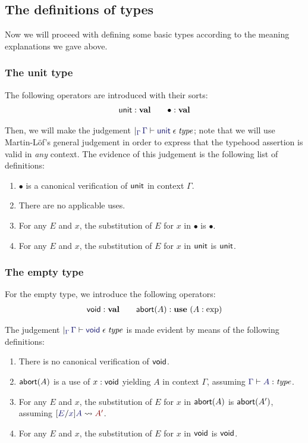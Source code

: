 \documentclass[main.tex]{subfiles}
\begin{document}
\subsection{The definitions of types}

Now we will proceed with defining some basic types according to the
meaning explanations we gave above.

\subsubsection{The unit type}

The following operators are introduced with their sorts:
\begin{gather*}
  \mathsf{unit} : \mathbf{val}\qquad \bullet : \mathbf{val}
\end{gather*}

Then, we will make the judgement
$\genj{\Gamma}{\lfsequent\Gamma\cantype\tyunit}$; note that we will use
Martin-L\"of's general judgement in order to express that the typehood
assertion is valid in \emph{any} context. The evidence of this
judgement is the following list of definitions:
\begin{enumerate}
  \item $\bullet$ is a canonical verification of $\mathsf{unit}$ in context $\Gamma$.
  \item There are no applicable uses.
  \item For any $E$ and $x$, the substitution of $E$ for $x$ in $\bullet$ is $\bullet$.
  \item For any $E$ and $x$, the substitution of $E$ for $x$ in $\mathsf{unit}$ is $\mathsf{unit}$.
\end{enumerate}

\subsubsection{The empty type}
For the empty type, we introduce the following operators:
\begin{gather*}
  \mathsf{void}:\mathbf{val} \qquad \mathsf{abort}(A):\mathbf{use}\ (A:\exp)
\end{gather*}

The judgement $\genj{\Gamma}{\lfsequent\Gamma\cantype\tyvoid}$ is made
evident by means of the following definitions:
\begin{enumerate}
  \item There is no canonical verification of $\mathsf{void}$.
  \item $\mathsf{abort}(A)$ is a use of $x:\mathsf{void}$ yielding $A$ in context $\Gamma$, assuming $\lfsequent\Gamma\type{A}$.
  \item For any $E$ and $x$, the substitution of $E$ for $x$ in $\mathsf{abort}(A)$ is $\mathsf{abort}(A')$, assuming $\hsubste{E}{x}{A}{A'}$.
  \item For any $E$ and $x$, the substitution of $E$ for $x$ in $\mathsf{void}$ is $\mathsf{void}$.
\end{enumerate}
\end{document}
